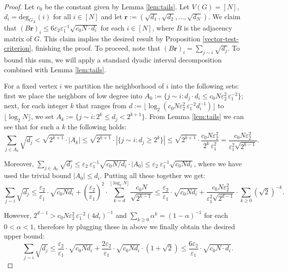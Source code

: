 \documentclass[12pt]{article}
\newcommand{\eps}{\varepsilon}
\begin{document}
\begin{proof}
   Let $c_0$ be the constant given by Lemma \ref{lem:tails}.
   Let $V(G)=[N]$, $d_i=\text{deg}_{G_X}(i)$ for all $i\in[N]$ and let $\mathbf{r}:=(\sqrt{d_1},\sqrt{d_2},\ldots,\sqrt{d_N} )$. We claim that $(B\mathbf{r})_i\leq 6\eps_2\eps_1^{-1}\sqrt{c_0N\cdot d_i}$ for each $i\in[N]$, where $B$ is the adjacency matrix of $G$. This claim implies the desired result by Proposition \ref{vector-test-criterion}, finishing the proof.  To proceed, note that $(B\mathbf{r})_i=\sum_{j\sim i}\sqrt{d_j}$. To bound this sum, we will apply a standard dyadic interval decomposition combined with Lemma \ref{lem:tails}.
    
    For a fixed vertex $i$ we partition the neighborhood of $i$ into the following sets: first we place the neighbors of low degree into $A_0:=\{j\sim i:d_j\cdot d_i\leq c_0N\eps_2^{2\ }\eps_1^{-2}\}$; next, for each integer $k$ that ranges from $d:=\lfloor\log_2(c_0N\eps_2^{2\ }\eps_1^{-2}d_i^{-1})\rfloor$ to $\lfloor\log_2N\rfloor$, we set $A_k:=\{j\sim i:2^k\leq d_j<2^{k+1}\}$. From Lemma \ref{lem:tails} we can see that for such a $k$ the following holds: $$\sum_{j\in A_k}\sqrt{d_j}<\sqrt{2^{k+1}}\cdot|A_k|\leq \sqrt{2^{k+1}}\cdot|\{j\sim i:d_j\geq 2^k\}|\leq \sqrt{2^{k+1}}\cdot \dfrac{c_0N\eps_2^2}{2^{k\ }\eps_1^2}=\dfrac{c_0N\eps_2^2}{\eps_1^2\sqrt{2^{k-1}}}.$$

Moreover,  $\displaystyle\sum_{j\in A_0} \sqrt{d_j}\leq \eps_2\ \eps_1^{-1}\sqrt{c_0N/d_i}\cdot |A_0|\leq \eps_2\ \eps_1^{-1}\sqrt{c_0Nd_i}$, where we have used the trivial bound $|A_0|\leq d_i$. Putting all these together we get:
$$\sum_{j\sim i}\sqrt{d_j}\leq \dfrac{\eps_2}{\eps_1}\cdot\sqrt{c_0Nd_i}+\left(\dfrac{\eps_2}{\eps_1}\right)^2 \cdot\sum_{k=d}^{\lfloor \log_2N\rfloor}\dfrac{c_0N}{\sqrt{2^{k-1}}}\leq\dfrac{\eps_2}{\eps_1}\cdot \sqrt{c_0Nd_i} +\dfrac{c_0N\eps_2^2}{\eps_1^2\sqrt{2^{d-1}}}\cdot \sum_{k\geq 0}\left(\sqrt{2}\right)^{-k}.$$

However, $2^{d-1}>c_0N\eps_2^{2\ }\eps_1^{-2}(4d_i)^{-1}$ and $\sum_{k\geq 0}\alpha^k =(1-\alpha)^{-1}$ for each $0<\alpha<1$, therefore by plugging these in above we finally obtain the desired upper bound:
$$\sum_{j\sim i}\sqrt{d_j}\leq \dfrac{\eps_2}{\eps_1}\cdot \sqrt{c_0Nd_i}+\dfrac{2\eps_2}{\eps_1}\cdot\sqrt{c_0Nd_i}\cdot (1+\sqrt{2})\leq \dfrac{6\eps_2}{\eps_1}\cdot\sqrt{c_0N\cdot d_i}.$$
\end{proof}
\end{document}
